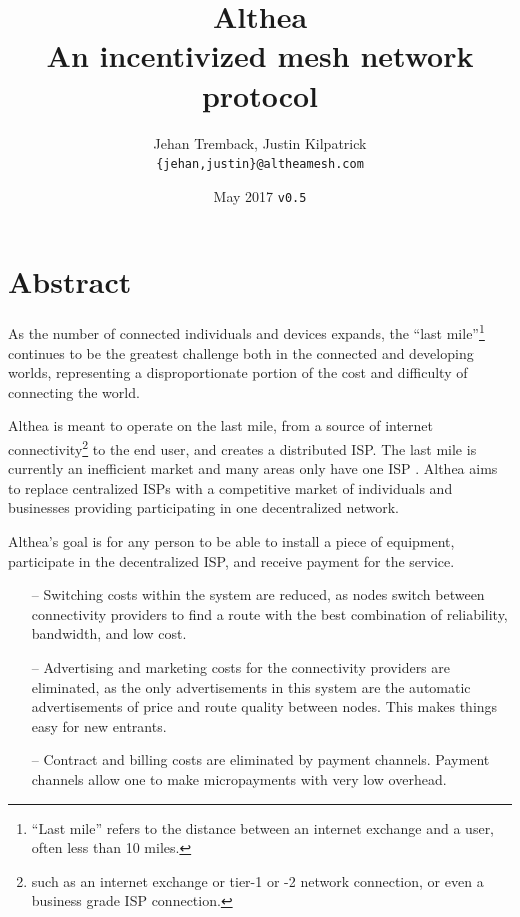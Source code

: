 \documentclass[11pt]{article}
\title{%
  \textbf{Althea} \\
	\vspace{3pt}
  \large An incentivized mesh network protocol}
\author{Jehan Tremback, Justin Kilpatrick\\
\texttt{\{jehan,justin\}@altheamesh.com}\\}
\date{May 2017 \texttt{v0.5}}
\newlength{\currentparskip}
\newenvironment{unbreakable}
  {\setlength{\currentparskip}{\parskip}%
	 \vspace{\currentparskip}
   \begin{minipage}{\textwidth}%
   \setlength{\parskip}{\currentparskip}%
  }
  {\end{minipage}\vspace{\currentparskip}}
\begin{document}
\maketitle

\begin{unbreakable}
\section*{Abstract}
\begin{small}
As the number of connected individuals and devices expands, the ``last mile''\footnote{``Last mile'' refers to the distance between an internet exchange and a user, often less than 10 miles.} continues to be the greatest challenge both in the connected and developing worlds, representing a disproportionate portion of the cost and difficulty of connecting the world.
 
Althea is meant to operate on the last mile, from a source of internet connectivity\footnote{such as an internet exchange or tier-1 or -2 network connection, or even a business grade ISP connection.} to the end user, and creates a distributed ISP. The last mile is currently an inefficient market and many areas only have one ISP \cite{fcc}. Althea aims to replace centralized ISPs with a competitive market of individuals and businesses providing participating in one decentralized network.

Althea’s goal is for any person to be able to install a piece of equipment, participate in the decentralized ISP, and receive payment for the service.

\begin{itemize}
\item[--] Switching costs within the system are reduced, as nodes switch between connectivity providers to find a route with the best combination of reliability, bandwidth, and low cost.
 
\item[--] Advertising and marketing costs for the connectivity providers are eliminated, as the only advertisements in this system are the automatic advertisements of price and route quality between nodes. This makes things easy for new entrants.
 
\item[--] Contract and billing costs are eliminated by payment channels. Payment channels allow one to make micropayments with very low overhead.
\end{itemize}
\end{small}
\end{unbreakable}
\end{document}
